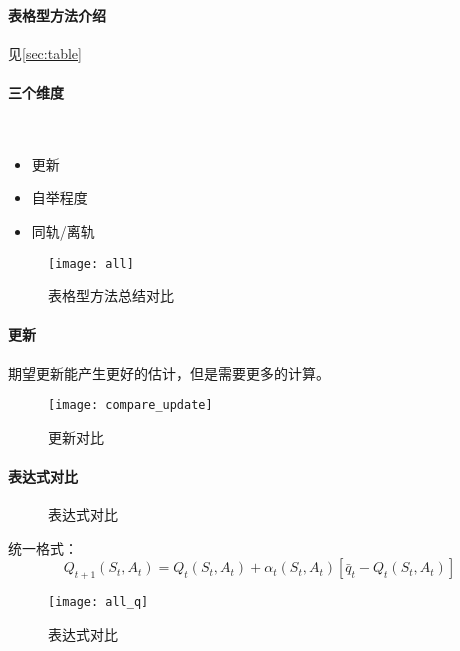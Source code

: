 \documentclass[
12pt, %
a4paper, 
oneside, %
headinclude,footinclude, %
]{scrartcl}
\begin{document}
\paragraph{表格型方法介绍}\label{sec:table back}
见\ref{sec:table}
\paragraph{三个维度}~\\
\begin{minipage}{0.3\textwidth}
\begin{itemize}
\item 更新
\item 自举程度
\item 同轨/离轨
\end{itemize}
\end{minipage}
\hfill
\begin{minipage}{0.6\textwidth}
\begin{figure}[H]
\centering
\texttt{[image: all]}
\caption[表格型方法总结对比]{表格型方法总结对比}
\end{figure}
\end{minipage}
\paragraph{更新}
期望更新能产生更好的估计，但是需要更多的计算。

\begin{figure}[H]
\centering
\texttt{[image: compare\_update]}
\caption[表格型方法更新对比]{更新对比}
\end{figure}
\paragraph{表达式对比}
\begin{figure}[H]
\centering
{} \quad
{} \quad
{}
\caption[表达式对比]{表达式对比}
\end{figure}

统一格式：
$$ Q_{t + 1}(S_t, A_t) = Q_t(S_t, A_t) + \alpha_t(S_t, A_t)[\bar{q}_t - Q_t(S_t, A_t)] $$

\begin{figure}[H]
\centering
\texttt{[image: all\_q]}
\caption[表达式对比]{表达式对比}
\end{figure}
\end{document}
